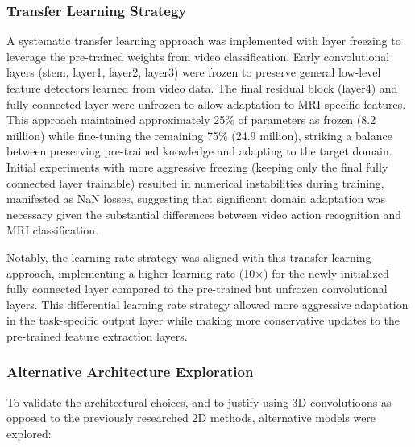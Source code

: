 \documentclass[12pt, a4paper]{article}
\begin{document}
\subsubsection{Transfer Learning Strategy}

A systematic transfer learning approach was implemented with layer freezing to leverage the pre-trained weights from video classification. Early convolutional layers (stem, layer1, layer2, layer3) were frozen to preserve general low-level feature detectors learned from video data. The final residual block (layer4) and fully connected layer were unfrozen to allow adaptation to MRI-specific features. This approach maintained approximately 25\% of parameters as frozen (8.2 million) while fine-tuning the remaining 75\% (24.9 million), striking a balance between preserving pre-trained knowledge and adapting to the target domain. Initial experiments with more aggressive freezing (keeping only the final fully connected layer trainable) resulted in numerical instabilities during training, manifested as NaN losses, suggesting that significant domain adaptation was necessary given the substantial differences between video action recognition and MRI classification.

Notably, the learning rate strategy was aligned with this transfer learning approach, implementing a higher learning rate (10×) for the newly initialized fully connected layer compared to the pre-trained but unfrozen convolutional layers. This differential learning rate strategy allowed more aggressive adaptation in the task-specific output layer while making more conservative updates to the pre-trained feature extraction layers.

\subsubsection{Alternative Architecture Exploration}

To validate the architectural choices, and to justify using 3D convolutioons as opposed to the previously researched 2D methods, alternative models were explored:
\end{document}
